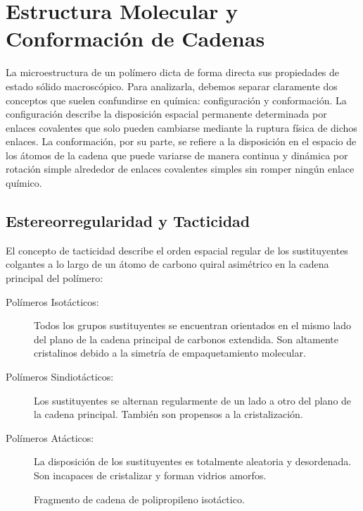 \chapter{Estructura Molecular y Conformación de Cadenas}
\label{cap:estructura}

La microestructura de un polímero dicta de forma directa sus propiedades de estado sólido macroscópico. Para analizarla, debemos separar claramente dos conceptos que suelen confundirse en química: configuración y conformación. La configuración describe la disposición espacial permanente determinada por enlaces covalentes que solo pueden cambiarse mediante la ruptura física de dichos enlaces. La conformación, por su parte, se refiere a la disposición en el espacio de los átomos de la cadena que puede variarse de manera continua y dinámica por rotación simple alrededor de enlaces covalentes simples sin romper ningún enlace químico.

\section{Estereorregularidad y Tacticidad}

El concepto de tacticidad describe el orden espacial regular de los sustituyentes colgantes a lo largo de un átomo de carbono quiral asimétrico en la cadena principal del polímero:

\begin{description}
    \item[Polímeros Isotácticos:] Todos los grupos sustituyentes se encuentran orientados en el mismo lado del plano de la cadena principal de carbonos extendida. Son altamente cristalinos debido a la simetría de empaquetamiento molecular.
    \item[Polímeros Sindiotácticos:] Los sustituyentes se alternan regularmente de un lado a otro del plano de la cadena principal. También son propensos a la cristalización.
    \item[Polímeros Atácticos:] La disposición de los sustituyentes es totalmente aleatoria y desordenada. Son incapaces de cristalizar y forman vidrios amorfos.
\end{description}

\begin{figure}[h]
    \centering
    \caption{Fragmento de cadena de polipropileno isotáctico.}
    \label{fig:tacticidad_propileno}
\end{figure}

